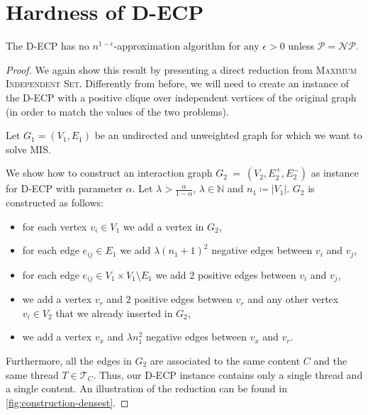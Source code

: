 \section{Hardness of \acrshort{D-ECP}}%
\label{sub:d-ecp-hardness}

\begin{theorem}
	\label{th:approximability-densest}
	The \acrfull{D-ECP} has no $n^{1-\epsilon} $-approximation algorithm for
	any $\epsilon > 0$ unless $\mathcal{P} = \mathcal{NP}  $.
\end{theorem}

\begin{proof}
	We again show this result by presenting a direct reduction from \textsc{Maximum
		Independent Set}. Differently from before, we will need to create an
	instance of the \acrshort{D-ECP} with a positive clique over
	independent vertices of the original graph (in order to match the values of
	the two problems).

	\bigskip
	Let $G_{1}  = (V_{1} ,E_{1} )$ be an undirected and unweighted graph for
	which we want to solve MIS.

	We show how to construct an interaction graph \mbox{${G}_{2}~=~(V_{2} , E^{+}_{2} , E
				^{-}_{2} ) $} as instance for \acrshort{D-ECP} with parameter
	$\alpha $. Let $\lambda > \frac{\alpha }{1 - \alpha }$, $\lambda \in \mathbb{N} $ and $n_{1} \coloneqq |V_{1}| $.
	$G_2$ is constructed as follows:

	\begin{itemize}
		\item for each vertex $v_{i}  \in V_{1} $ we add a vertex in $G_{2} $,
		\item for each edge $e_{ij}  \in
			      E_{1} $ we add $\lambda (n_{1}+1)^{2}  $ negative edges
		      between $v_{i} $ and $v_{j} $,
		\item for each edge $e_{ij} \in V_1 \times V_1 \setminus
			      E_{1} $ we add $2$ positive edges between $v_{i} $ and $v_{j}
		      $,
		\item we add a vertex $v_r$ and $2$ positive edges between $v_r$ and any other
		      vertex $v_i \in V_2$ that we already inserted in $G_2$,
		\item we add a vertex $v_x$ and $\lambda n_{1}^{2}  $ negative edges between $v_x$
		      and $v_{r} $.
	\end{itemize}

	Furthermore, all the edges in $G_{2} $ are associated to the same content
	$C$ and the same thread $T \in \mathcal{T}_{C}  $. Thus, our \acrshort{D-ECP} instance contains only a single thread and a
	single content.
	An illustration of the reduction can be found in
	\autoref{fig:construction-densest}.


\end{proof}
